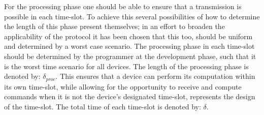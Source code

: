\bigskip \noindent
For the processing phase one should be able to ensure that a transmission is possible in each time-slot.
To achieve this several possibilities of how to determine the length of this phase present themselves; in an effort to broaden the applicability of the protocol it has been chosen that this too, should be uniform and determined by a worst case scenario.%
The processing phase in each time-slot should be determined by the programmer at the development phase, such that it is the worst time scenario for all devices.
The length of the processing phase is denoted by: $\delta_{proc}$.
This ensures that a device can perform its computation within its own time-slot, while allowing for the opportunity to receive and compute commands when it is not the device's designated time-slot,  represents the design of the time-slot.
The total time of each time-slot is denoted by: $\delta$.

